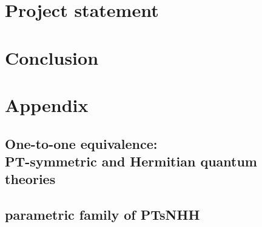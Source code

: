\documentclass[12pt, a4paper]{report}
\newcommand\PT{\(\mathcal{PT}\)}
\begin{document}
\chapter{Project statement}\label{mine}

\chapter{Conclusion}\label{Conclusion}





%


\chapter{Appendix}\label{appendix}

\section*{One-to-one equivalence:\\ PT-symmetric and Hermitian quantum theories}\label{AppDict}



\section*{parametric family of PTsNHH}\label{Appparametricfam}

\end{document}
